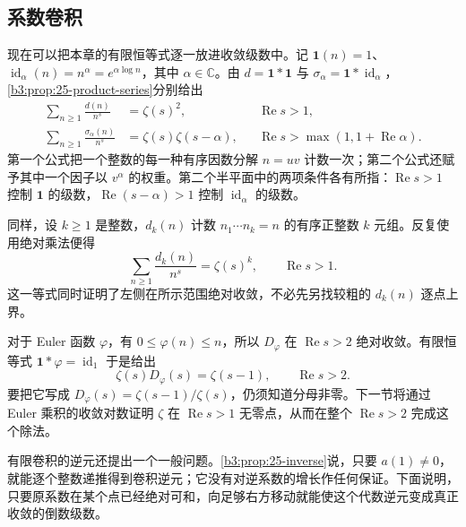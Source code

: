 \subsection{系数卷积}
\label{b3:subsec:250404}

现在可以把本章的有限恒等式逐一放进收敛级数中。记 \(\mathbf1(n)=1\)、\(\operatorname{id}_{\alpha}(n)=n^{\alpha}=e^{\alpha\log n}\)，其中 \(\alpha\in\mathbb C\)。由 \(d=\mathbf1*\mathbf1\) 与 \(\sigma_{\alpha}=\mathbf1*\operatorname{id}_{\alpha}\)，\cref{b3:prop:25-product-series}分别给出
\begin{align}
 \sum_{n\ge1}\frac{d(n)}{n^s}
 &=\zeta(s)^2,
 &&\operatorname{Re}s>1,\label{b3:eq:25-divisor-series}\\
 \sum_{n\ge1}\frac{\sigma_{\alpha}(n)}{n^s}
 &=\zeta(s)\zeta(s-\alpha),
 &&\operatorname{Re}s>\max(1,1+\operatorname{Re}\alpha).
 \label{b3:eq:25-divisor-power-series}
\end{align}
第一个公式把一个整数的每一种有序因数分解 \(n=uv\) 计数一次；第二个公式还赋予其中一个因子以 \(v^{\alpha}\) 的权重。第二个半平面中的两项条件各有所指：\(\operatorname{Re}s>1\) 控制 \(\mathbf1\) 的级数，\(\operatorname{Re}(s-\alpha)>1\) 控制 \(\operatorname{id}_{\alpha}\) 的级数。

同样，设 \(k\ge1\) 是整数，\(d_k(n)\) 计数 \(n_1\cdots n_k=n\) 的有序正整数 \(k\) 元组。反复使用绝对乘法便得
\[
 \sum_{n\ge1}\frac{d_k(n)}{n^s}=\zeta(s)^k,
 \qquad\operatorname{Re}s>1.
\]
这一等式同时证明了左侧在所示范围绝对收敛，不必先另找较粗的 \(d_k(n)\) 逐点上界。

对于 Euler 函数 \(\varphi\)，有 \(0\le\varphi(n)\le n\)，所以 \(D_{\varphi}\) 在 \(\operatorname{Re}s>2\) 绝对收敛。有限恒等式 \(\mathbf1*\varphi=\operatorname{id}_1\) 于是给出
\[
 \zeta(s)D_{\varphi}(s)=\zeta(s-1),
 \qquad\operatorname{Re}s>2.
\]
要把它写成 \(D_{\varphi}(s)=\zeta(s-1)/\zeta(s)\)，仍须知道分母非零。下一节将通过 Euler 乘积的收敛对数证明 \(\zeta\) 在 \(\operatorname{Re}s>1\) 无零点，从而在整个 \(\operatorname{Re}s>2\) 完成这个除法。

有限卷积的逆元还提出一个一般问题。\cref{b3:prop:25-inverse}说，只要 \(a(1)\ne0\)，就能逐个整数递推得到卷积逆元；它没有对逆系数的增长作任何保证。下面说明，只要原系数在某个点已经绝对可和，向足够右方移动就能使这个代数逆元变成真正收敛的倒数级数。

